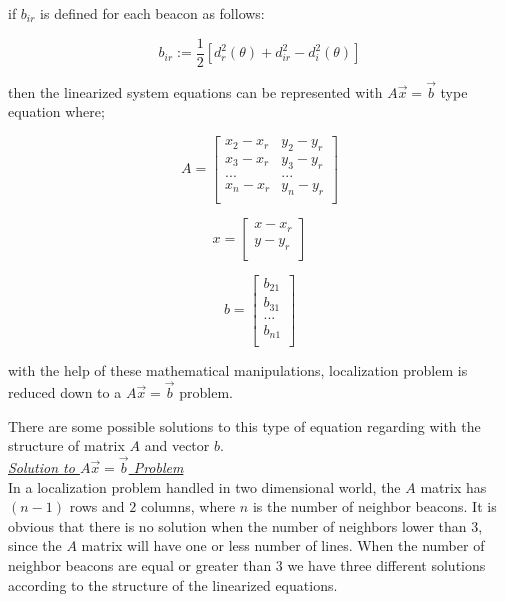if $b_{ir}$ is defined for each beacon as follows:

\begin{equation}
b_{ir} := \frac{1}{2}[d_r^2(\theta) + d_{ir}^2 - d_i^2(\theta)]
\end{equation}

then the linearized system equations can be represented with $A\vec{x} = \vec{b}$ type equation where;

\begin{equation}
A = \begin{bmatrix}
x_2 - x_r & y_2 - y_r\\
x_3 - x_r & y_3 - y_r\\
...       & ...      \\
x_n - x_r & y_n - y_r\\
\end{bmatrix}				
\end{equation}

\begin{equation}
x = \begin{bmatrix}
x - x_r\\
y - y_r\\
\end{bmatrix}
\end{equation}

\begin{equation}
b = \begin{bmatrix}
b_{21}\\
b_{31}\\
... \\
b_{n1}\\
\end{bmatrix}
\end{equation}

with the help of these mathematical manipulations, localization problem is reduced down to a $A\vec{x} = \vec{b}$ problem.

There are some possible solutions to this type of equation regarding with the structure of matrix $A$ and vector $b$.\\

\underline {\textit{Solution to $A\vec{x} = \vec{b}$ Problem}}\\
In a localization problem handled in two dimensional world, the $A$ matrix has $(n-1)$ rows and $2$ columns, where $n$ is the number of neighbor beacons. It is obvious that there is no solution when the number of neighbors lower than $3$, since the $A$ matrix will have one or less number of lines. When the number of neighbor beacons are equal or greater than $3$ we have three different solutions according to the structure of the linearized equations.

